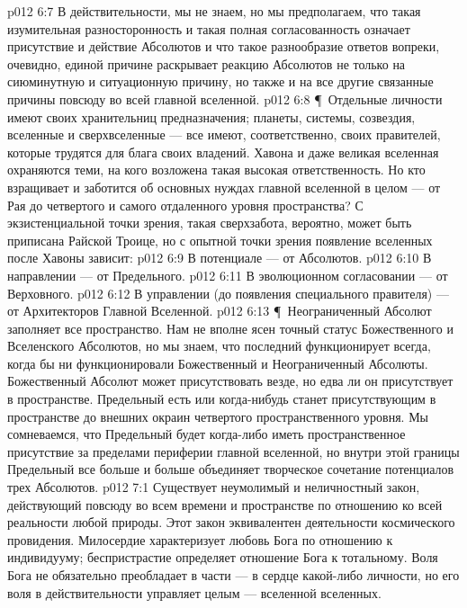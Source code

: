 \vs p012 6:7 В действительности, мы не знаем, но мы предполагаем, что такая изумительная разносторонность и такая полная согласованность означает присутствие и действие Абсолютов и что такое разнообразие ответов вопреки, очевидно, единой причине раскрывает реакцию Абсолютов не только на сиюминутную и ситуационную причину, но также и на все другие связанные причины повсюду во всей главной вселенной.
\vs p012 6:8 \P\ Отдельные личности имеют своих хранительниц предназначения; планеты, системы, созвездия, вселенные и сверхвселенные --- все имеют, соответственно, своих правителей, которые трудятся для блага своих владений. Хавона и даже великая вселенная охраняются теми, на кого возложена такая высокая ответственность. Но кто взращивает и заботится об основных нуждах главной вселенной в целом --- от Рая до четвертого и самого отдаленного уровня пространства? С экзистенциальной точки зрения, такая сверхзабота, вероятно, может быть приписана Райской Троице, но с опытной точки зрения появление вселенных после Хавоны зависит:
\vs p012 6:9 \bibnobreakspace В потенциале --- от Абсолютов.
\vs p012 6:10 \bibnobreakspace В направлении --- от Предельного.
\vs p012 6:11 \bibnobreakspace В эволюционном согласовании --- от Верховного.
\vs p012 6:12 \bibnobreakspace В управлении (до появления специального правителя) --- от Архитекторов Главной Вселенной.
\vs p012 6:13 \P\ Неограниченный Абсолют заполняет все пространство. Нам не вполне ясен точный статус Божественного и Вселенского Абсолютов, но мы знаем, что последний функционирует всегда, когда бы ни функционировали Божественный и Неограниченный Абсолюты. Божественный Абсолют может присутствовать везде, но едва ли он присутствует в пространстве. Предельный есть или когда\hyp{}нибудь станет присутствующим в пространстве до внешних окраин четвертого пространственного уровня. Мы сомневаемся, что Предельный будет когда\hyp{}либо иметь пространственное присутствие за пределами периферии главной вселенной, но внутри этой границы Предельный все больше и больше объединяет творческое сочетание потенциалов трех Абсолютов.
\vs p012 7:1 Существует неумолимый и неличностный закон, действующий повсюду во всем времени и пространстве по отношению ко всей реальности любой природы. Этот закон эквивалентен деятельности космического провидения. Милосердие характеризует любовь Бога по отношению к индивидууму; беспристрастие определяет отношение Бога к тотальному. Воля Бога не обязательно преобладает в части --- в сердце какой\hyp{}либо личности, но его воля в действительности управляет целым --- вселенной вселенных.
